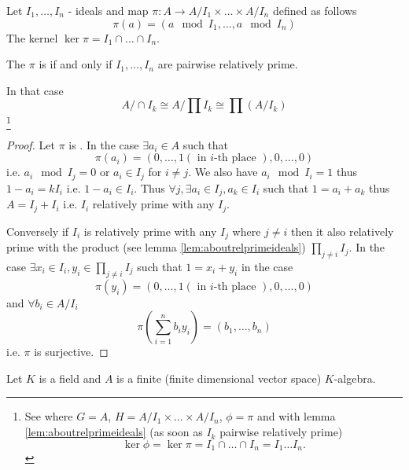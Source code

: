 \begin{theorem}
  Let $I_1, \dots, I_n$ - ideals and map
  $\pi: A \to A/I_1 \times \dots \times A/I_n$ defined as follows
  \[
  \pi(a) = \left(a \mod I_1, \dots, a \mod I_n\right)
  \]
  The kernel $\ker \pi = I_1 \cap \dots \cap I_n$.

  The $\pi$ is  if and only if $I_1, \dots,
  I_n$ are pairwise relatively prime.

  In that case
  \[
  A/\cap I_k
  \cong
  A/\prod I_k
  \cong
  \prod \left(A/I_k\right)
  \]
  \footnote{
    See  where 
    $G = A$,
    $H = A/I_1 \times \dots \times A/I_n$, $\phi = \pi$ and  with
    lemma \ref{lem:aboutrelprimeideals} (as soon as $I_k$ pairwise
    relatively prime)
    \[
    \ker \phi = \ker \pi = I_1 \cap \dots \cap I_n = I_1 \dots I_n.
    \]
  }
  
  \begin{proof}
    Let $\pi$ is . In the case
    $\exists a_i \in A$ such that
    \[
    \pi(a_i) = \left(0, \dots, 1 (\mbox{ in }i\mbox{-th place }),
    0, \dots, 0\right)
    \]
    i.e.
    $a_i \mod I_j = 0$ or $a_i \in I_j$ for $i \ne j$. We also have
    $a_i \mod I_i = 1$ thus $1 - a_i = k I_i$ i.e. $1 - a_i \in I_i$. 
    Thus $\forall j, \exists a_i \in I_j, a_k \in I_i$ such that
    $1 = a_i + a_k$ thus $A = I_j + I_i$ i.e. $I_i$ relatively prime
    with any $I_j$.

    Conversely if $I_i$ is relatively prime with any $I_j$ where $j
    \ne i$ then it also relatively prime with the product (see lemma
    \ref{lem:aboutrelprimeideals}) $\prod_{j \ne i} I_j$. In the case
    $\exists x_i \in I_i, y_i \in \prod_{j \ne i} I_j$ such that
    $1 = x_i + y_i$ in the case
    \[
    \pi(y_i) = \left(0, \dots, 1 (\mbox{ in }i\mbox{-th place }),
    0, \dots, 0\right)
    \]
    and $\forall b_i \in A/I_i$
    \[
    \pi \left(\sum_{i = 1}^n b_i y_i\right) =
    \left(b_1, \dots, b_n\right)
    \]
    i.e. $\pi$ is surjective.
  \end{proof}
  \label{thm:chineseremainder}
\end{theorem}

Let $K$ is a field and $A$ is a finite (finite dimensional vector
space) $K$-algebra.

